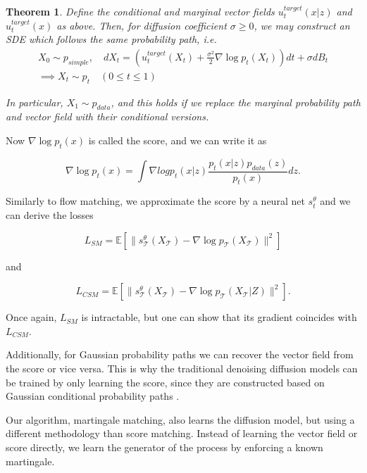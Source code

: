 \documentclass[12pt]{article}
\theoremstyle{break}
\newtheorem{theorem}{Theorem}[section]
\begin{document}
\begin{theorem}
	Define the conditional and marginal vector fields $u_t^{target}(x|z)$ and $u_t^{target}(x)$ as above. Then, for diffusion coefficient $\sigma \geq 0$, we may construct an SDE which follows the same probability path, i.e.
	\begin{gather}
		X_0 \sim p_{simple}, \quad dX_t = \left( u_t^{target}(X_t) + \frac{\sigma^2}{2} \nabla \log p_t(X_t) \right) dt + \sigma dB_t \\
		\implies X_t \sim p_t \quad (0 \leq t \leq 1)
	\end{gather}

	In particular, $X_1 \sim p_{data}$, and this holds if we replace the marginal probability path and vector field with their conditional versions.
\end{theorem}

Now $\nabla \log p_t(x)$ is called the score, and we can write it as

\begin{equation*}
	\nabla \log p_t(x) = \int \nabla log p_t (x|z) \frac{p_t(x|z)p_{data}(z)}{p_t(x)}dz.
\end{equation*}

Similarly to flow matching, we approximate the score by a neural net $s_t^{\theta}$ and we can derive the losses

\begin{equation*}
	L_{SM} = \mathbb{E}[\|s_\mathcal{T}^{\theta}(X_\mathcal{T}) - \nabla \log p_\mathcal{T}(X_\mathcal{T})\|^2]
\end{equation*}

and

\begin{equation*}
	L_{CSM} = \mathbb{E}[\|s_\mathcal{T}^{\theta}(X_\mathcal{T}) - \nabla \log p_\mathcal{T}(X_\mathcal{T}|Z)\|^2].
\end{equation*}

Once again, $L_{SM}$ is intractable, but one can show that its gradient coincides with $L_{CSM}$.

Additionally, for Gaussian probability paths we can recover the vector field from the score or vice versa. This is why the traditional denoising diffusion models can be trained by only learning the score, since they are constructed based on Gaussian conditional probability paths \cite{song2021}.

Our algorithm, martingale matching, also learns the diffusion model, but using a different methodology than score matching. Instead of learning the vector field or score directly, we learn the generator of the process by enforcing a known martingale.
\end{document}
